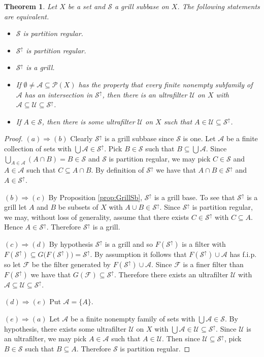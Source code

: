 \documentclass[12pt]{article}
\theoremstyle{plain}
\newtheorem{thm}{Theorem}[section]
\theoremstyle{definition}
\newcommand{\calA}{\mathcal{A}}
\newcommand{\calF}{\mathcal{F}}
\newcommand{\calP}{\mathcal{P}}
\newcommand{\calS}{\mathcal{S}}
\newcommand{\calU}{\mathcal{U}}
\begin{document}
\begin{thm}
  Let $X$ be a set and $\calS$ a grill subbase on $X$.
  The following statements are equivalent.
  \begin{itemize}
    \item[(a)] $\calS$ is partition regular.
    \item[(b)] $\calS^\uparrow$ is partition regular.
    \item[(c)] $\calS^\uparrow$ is a grill.
    \item[(d)] If $\emptyset \ne\calA \subseteq \calP(X)$ has the property that every finite nonempty subfamily of $\calA$ has an intersection in $\calS^\uparrow$, then there is an ultrafilter $\calU$ on $X$ with $\calA \subseteq \calU \subseteq \calS^\uparrow$.
    \item[(e)] If $A \in \calS$, then there is some ultrafilter $\calU$ on $X$ such that $A \in \calU \subseteq \calS^\uparrow$.
  \end{itemize}
\end{thm}
\begin{proof}
  $(a) \Rightarrow (b)$
  Clearly $\calS^\uparrow$ is a grill subbase since $\calS$ is one.
  Let $\calA$ be a finite collection of sets with $\bigcup\calA \in \calS^\uparrow$.
  Pick $B \in \calS$ such that $B \subseteq \bigcup\calA$. 
  Since $\bigcup_{A \in \calA} (A \cap B) = B \in \calS$ and $\calS$ is partition regular, we may pick $C \in \calS$ and $A \in \calA$ such that $C \subseteq A \cap B$. 
  By definition of $\calS^\uparrow$ we have that $A \cap B \in \calS^\uparrow$ and $A \in \calS^\uparrow$.

  $(b) \Rightarrow (c)$
  By Proposition \ref{prop:GrillSb}, $\calS^\uparrow$ is a grill base.
  To see that $\calS^\uparrow$ is a grill let $A$ and $B$ be subsets of $X$ with $A \cup B \in \calS^\uparrow$.
  Since $\calS^\uparrow$ is partition regular, we may, without loss of generality, assume that there exists $C \in \calS^\uparrow$ with $C \subseteq A$.
  Hence $A \in \calS^\uparrow$.
  Therefore $\calS^\uparrow$ is a grill.

  $(c) \Rightarrow (d)$
  By hypothesis $\calS^\uparrow$ is a grill and so $F(\calS^\uparrow)$ is a filter with $F(\calS^\uparrow) \subseteq G\bigl(F(\calS^\uparrow)\bigr) = \calS^\uparrow$.
  By assumption it follows that $F(\calS^\uparrow) \cup \calA$ has f.i.p. so let $\calF$ be the filter generated by $F(\calS^\uparrow) \cup \calA$. 
  Since $\calF$ is a finer filter than $F(\calS^\uparrow)$ we have that $G(\calF) \subseteq \calS^\uparrow$. 
  Therefore there exists an ultrafilter $\calU$ with $\calA \subseteq \calU \subseteq \calS^\uparrow$.

  $(d) \Rightarrow (e)$
  Put $\calA = \{A\}$.

  $(e) \Rightarrow (a)$
  Let $\calA$ be a finite nonempty family of sets with $\bigcup\calA \in \calS$. 
  By hypothesis, there exists some ultrafilter $\calU$ on $X$ with $\bigcup\calA \in \calU \subseteq \calS^\uparrow$.
  Since $\calU$ is an ultrafilter, we may pick $A \in \calA$ such that $A \in \calU$. 
  Then since $\calU \subseteq \calS^\uparrow$, pick $B \in \calS$ such that $B \subseteq A$.
  Therefore $\calS$ is partition regular.
\end{proof}
\end{document}
